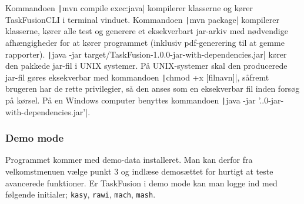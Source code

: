 Kommandoen \texttt|mvn compile exec:java| kompilerer klasserne og kører TaskFusionCLI i terminal vinduet.\newline
Kommandoen \texttt|mvn package| kompilerer klasserne, kører alle test og generere et eksekverbart jar-arkiv med nødvendige afhængigheder for at kører programmet (inklusiv pdf-generering til at gemme rapporter).\newline
\texttt|java -jar target/TaskFusion-1.0.0-jar-with-dependencies.jar| kører den pakkede jar-fil i UNIX systemer. På UNIX-systemer skal den producerede jar-fil gøres eksekverbar med kommandoen \texttt|chmod +x [filnavn]|, såfremt brugeren har de rette privilegier, så den anses som en eksekverbar fil inden forsøg på kørsel. På en Windows computer benyttes kommandoen \texttt|java -jar '.\target{}.0-jar-with-dependencies.jar'|.
\subsubsection{Demo mode}
Programmet kommer med demo-data installeret. Man kan derfor fra velkomstmenuen vælge punkt 3 og indlæse demosættet for hurtigt at teste avancerede funktioner. Er TaskFusion i demo mode kan man logge ind med følgende initialer; \texttt{kasy}, \texttt{rawi}, \texttt{mach}, \texttt{mash}.
